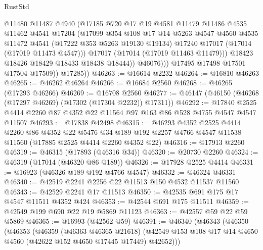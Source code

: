 \begin{lexlean}{RustStd}
\begin{coremodule}
{\begin{coremodule}
{{{{{{{{{{{{{{{{{{{{{{{{{{{{{{{{{{{{{{{{{{{{{{{{{{{{{{{                      @11480
                      @11487
                      @4940
                      (@17185
                        @720
                        @17
                        @19
                        @4581
                        @11479
                        @11486
                        @4535
                        @11462
                        @4541
                        @17204
                        (@17099
                          @354
                          @108
                          @17
                          @14
                          @5263
                          @4547
                          @4560
                          @4535
                          @11472
                          @4541
                          (@17222 @353 @5263 @19130 @19134)
                          @17240
                          @17017
                          (@17014 (@17019 @11473 @4547)))
                        @17017
                        (@17014 (@17019 @11463 @11479)))
                      @18423
                      @18426
                      @18429
                      @18433
                      @18438
                      @18444))
                  @46076)))
            @17495
            @17498
            @17501
            @17504
            @17509))
        @17285))
@46263 := @16614 @2232
@46264 := @16810 @46263
@46265 := @46262 @46264
@46266 := @16684 @2560
@46268 := @46265 (@17293 @46266)
@46269 := @16708 @2560
@46277 := @46147 (@46150 (@46268 (@17297 @46269) (@17302 (@17304 @2232)) @17311))
@46292 := @17840 @2525 @4414 @2260 @87 @4352 @22 @11564 @97 @163 @86 @528 @4755 @4547 @4547 @11507
@46293 := @17838 @42498
@46315 := @46293
    @4352
    @2525
    @4414
    @2260
    @86
    @4352
    @22
    @5476
    @34
    @189
    @192
    @2257
    @4766
    @4547
    @11538
    @11560
    (@17885 @2525 @4414 @2260 @4352 @22)
@46316 := @17913 @2260
@46319 := @46315 (@17893 (@46316 @34))
@46320 := @20730 @2260
@46324 := @46319 (@17014 (@46320 @86 @189))
@46326 := @17928 @2525 @4414
@46331 := @16923 (@46326 @189 @192 @4766 @4547)
@46332 := @46324 @46331
@46340 := @42519 @2241 @2256 @22 @11513 @150 @4532 @11537 @11560
@46343 := @42529 @2241 @17 @11513
@46350 := @42535 @691 @175 @17 @4547 @11511 @4352 @424
@46353 := @42544 @691 @175 @11511
@46359 := @42549 @199 @690 @22 @19 @5869 @11123
@46363 := @42557 @59 @22 @59 @5869
@46365 := @16993 (@42562 @59)
@46391 := @46340
    (@46343
      (@46350
        (@46353
          (@46359
            (@46363 @46365 @21618)
            (@42549 @153 @108 @17 @14 @4650 @4560 (@42622 @152 @4650 @17445 @17449) @42652)))
}}}}}}}}}}}}}}}}}}}}}}}}}}}}}}}}}}}}}}}}}}}}}}}}}}}}}}}
\end{coremodule}}
\end{coremodule}
\end{lexlean}
